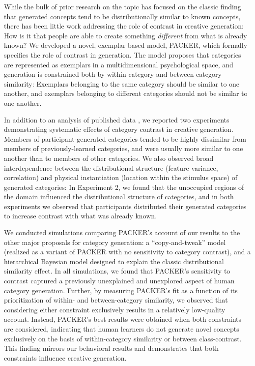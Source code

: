 \documentclass[12pt]{article}
\begin{document}
\begin{flushleft}
While the bulk of prior research on the topic has focused on the classic finding
that generated concepts tend to be distributionally similar to known concepts,
there has been little work addressing the role of contrast in creative
generation: How is it that people are able to create something {\em different}
from what is already known? We developed a novel, exemplar-based model, PACKER,
which formally specifies the role of contrast in generation. The model proposes
that categories are represented as exemplars in a multidimensional psychological
space, and generation is constrained both by within-category and
between-category similarity: Exemplars belonging to the same category should be
similar to one another, and exemplars belonging to different categories should
not be similar to one another.

In addition to an analysis of published data \citep[][Experiment
3]{jern2013probabilistic}, we reported two experiments demonstrating systematic
effects of category contrast in creative generation. Members of
participant-generated categories tended to be highly dissimilar from members of
previously-learned categories, and were usually more similar to one another than
to members of other categories. We also observed broad interdependence between
the distributional structure (feature variance, correlation) and physical
instantiation (location within the stimulus space) of generated categories: In
Experiment 2, we found that the unoccupied regions of the domain influenced the
distributional structure of categories, and in both experiments we observed that
participants distributed their generated categories to increase contrast with
what was already known.

We conducted simulations comparing PACKER's account of our results to the other
major proposals for category generation: a ``copy-and-tweak'' model (realized as
a variant of PACKER with no sensitivity to category contrast), and a
hierarchical Bayesian model designed to explain the classic distributional
similarity effect. In all simulations, we found that PACKER's sensitivity to
contrast captured a previously unexplained and unexplored aspect of human
category generation. Further, by measuring PACKER's fit as a function of its
prioritization of within- and between-category similarity, we observed that
considering either constraint exclusively results in a relatively low-quality
account. Instead, PACKER's best results were obtained when both constraints are
considered, indicating that human learners do not generate novel concepts
exclusively on the basis of within-category similarity or between
class-contrast. This finding mirrors our behavioral results and demonstrates
that both constraints influence creative generation.


\end{flushleft}
\end{document}

